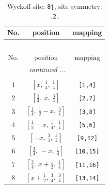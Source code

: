 \documentclass[fleqn,8pt]{jsarticle}
\begin{document}
\begin{longtable}{ccc}
\caption{Wyckoff site: {\tt 8j}, site symmetry: {\tt .2.}}
 \\
 \hline \hline
No. & position & mapping \\ \hline \endfirsthead

\multicolumn{2}{l}{\tablename\ \thetable{}} \\
 \hline \hline
No. & position & mapping \\ \hline \endhead

 \hline \hline
\multicolumn{2}{r}{\footnotesize\it continued ...} \\ \endfoot

 \hline \hline
\multicolumn{2}{r}{} \\ \endlastfoot

1 & $\left[ x,\, \frac{1}{4},\, \frac{1}{4} \right]$ & {\tt [1,4]} \\ \hline
2 & $\left[ \frac{1}{4},\, x,\, \frac{3}{4} \right]$ & {\tt [2,7]} \\ \hline
3 & $\left[ \frac{1}{4},\, \frac{1}{2} - x,\, \frac{3}{4} \right]$ & {\tt [3,8]} \\ \hline
4 & $\left[ \frac{1}{2} - x,\, \frac{1}{4},\, \frac{1}{4} \right]$ & {\tt [5,6]} \\ \hline
5 & $\left[ - x,\, \frac{3}{4},\, \frac{3}{4} \right]$ & {\tt [9,12]} \\ \hline
6 & $\left[ \frac{3}{4},\, - x,\, \frac{1}{4} \right]$ & {\tt [10,15]} \\ \hline
7 & $\left[ \frac{3}{4},\, x + \frac{1}{2},\, \frac{1}{4} \right]$ & {\tt [11,16]} \\ \hline
8 & $\left[ x + \frac{1}{2},\, \frac{3}{4},\, \frac{3}{4} \right]$ & {\tt [13,14]} \\
\end{longtable}
\renewcommand{\arraystretch}{1.2}
\end{document}
